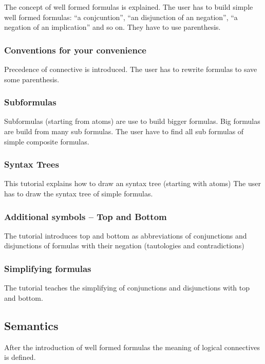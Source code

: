 The concept of well formed formulas is explained. 
The user has to build simple well formed formulas: 
“a conjcuntion”, “an disjunction of an negation”, “a negation of an implication” and so on.
They have to use parenthesis.

\subsubsection{Conventions for your convenience}

Precedence of connective is introduced. 
The user has to rewrite formulas 
to save some parenthesis.

\subsubsection{Subformulas}

Subformulas (starting from atoms) are use to build bigger formulas. Big formulas are build from many sub formulas.
The user have to find all sub formulas of simple composite formulas.

\subsubsection{Syntax Trees}

This tutorial explains how to draw an syntax tree (starting with atoms)
The user has to draw the syntax tree of simple formulas.

\subsubsection{Additional symbols – Top and Bottom}

The tutorial introduces top and bottom  
as abbreviations of conjunctions and disjunctions 
of formulas with their negation (tautologies and contradictions)

\subsubsection{Simplifying formulas}

The tutorial teaches the simplifying of conjunctions and disjunctions with top and bottom.

\subsection{Semantics}

After the introduction of well formed formulas the meaning of logical connectives is defined.

